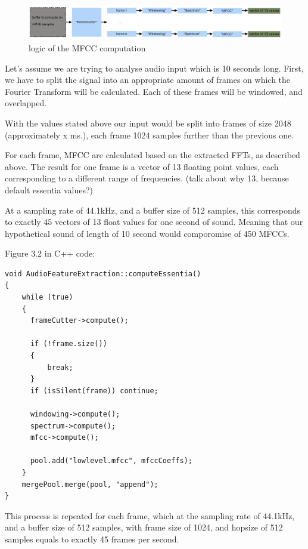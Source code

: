 \begin{figure}[h]
\caption{logic of the MFCC computation}
\centering
\includegraphics[width=1\textwidth]{images/essentia_logic}
\end{figure}



Let's assume we are trying to analyse audio input which is 10 seconds
long. First, we have to split the signal into an appropriate amount of
frames on which the Fourier Transform will be calculated. Each of
these frames will be windowed, and overlapped.

With the values stated above our input would be split into frames of
size 2048 (approximately x ms.), each frame 1024 samples further than
the previous one.

For each frame, MFCC are calculated based on the extracted FFTs, as
described above. The result for one frame is a vector of 13 floating
point values, each corresponding to a different range of
frequencies. (talk about why 13, because default essentia values?)

At a sampling rate of 44.1kHz, and a buffer size of 512 samples, this
corresponds to exactly 45 vectors of 13 float values for one second of
sound. Meaning that our hypothetical sound of length of 10 second
would comporomise of 450 MFCCs.

Figure 3.2 in C++ code:
\begin{lstlisting}
void AudioFeatureExtraction::computeEssentia()
{
    while (true)
    {
      frameCutter->compute();

      if (!frame.size())
      {
          break;
      }
      if (isSilent(frame)) continue;
        
      windowing->compute();
      spectrum->compute();
      mfcc->compute();
      
      pool.add("lowlevel.mfcc", mfccCoeffs);
    }
    mergePool.merge(pool, "append");
}
\end{lstlisting}

This process is repeated for each frame, which at the sampling rate of
44.1kHz, and a buffer size of 512 samples, with frame size of 1024,
and hopsize of 512 samples equals to exactly 45 frames per
second. 

